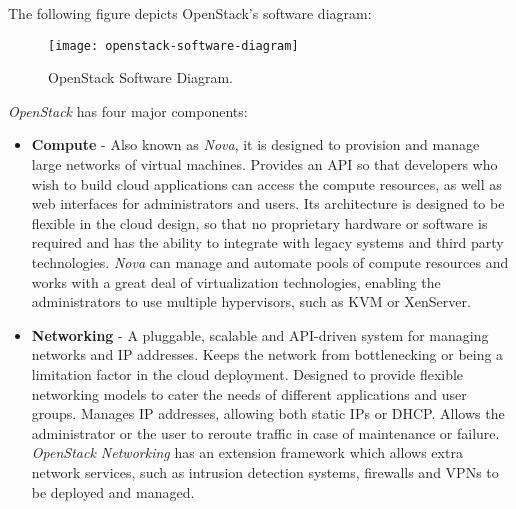The following figure depicts OpenStack's software diagram:

\begin{figure}[h]
  \begin{center}
    \leavevmode
    \texttt{[image: openstack-software-diagram]}
    \caption{OpenStack Software Diagram.~\cite{openstack}}
    \label{fig:openstack_sw_diag}
  \end{center}
\end{figure}

\textit{OpenStack} has four major components:

\begin{itemize}
\item \textbf{Compute} - Also known as \textit{Nova}, it is designed to provision and manage large networks of virtual machines. Provides an API so that developers who wish to build cloud applications can access the compute resources, as well as web interfaces for administrators and users. Its architecture is designed to be flexible in the cloud design, so that no proprietary hardware or software is required and has the ability to integrate with legacy systems and third party technologies. \textit{Nova} can manage and automate pools of compute resources and works with a great deal of virtualization technologies, enabling the administrators to use multiple hypervisors, such as KVM or XenServer.
\item \textbf{Networking} - A pluggable, scalable and API-driven system for managing networks and IP addresses. Keeps the network from bottlenecking or being a limitation factor in the cloud deployment. Designed to provide flexible networking models to cater the needs of different applications and user groups. Manages IP addresses, allowing both static IPs or DHCP. Allows the administrator or the user to reroute traffic in case of maintenance or failure. \textit{OpenStack Networking} has an extension framework which allows extra network services, such as intrusion detection systems, firewalls and VPNs to be deployed and managed.

\end{itemize}
